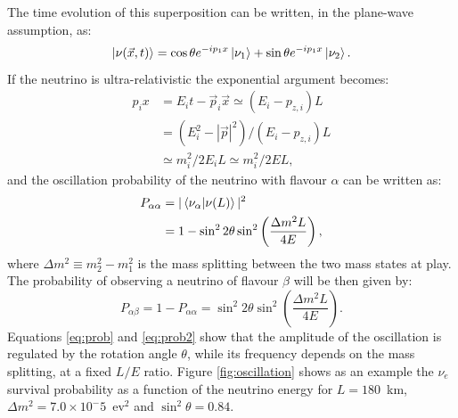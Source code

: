 The time evolution of this superposition can be written, in the plane-wave assumption, as:
\begin{equation}
    \ket{\nu(\vec{x},t)} = \cos\theta e^{-ip_{1}x}\ket{\nu_{1}}+\sin\theta e^{-ip_{1}x}\ket{\nu_{2}}.
\end{equation}
If the neutrino is ultra-relativistic the exponential argument becomes:
\begin{equation}
\begin{split}
    p_{i}x & = E_{i}t - \vec{p}_{i}\vec{x} \simeq (E_{i}-p_{z,i})L\\
           & = (E_{i}^2-|\vec{p}|^{2})/(E_{i}-p_{z,i})L\\
           & \simeq m_i^{2}/2E_{i}L \simeq m_i^{2}/2E L,
\end{split}
\end{equation}
and the oscillation probability of the neutrino with flavour $\alpha$ can be written as:
\begin{equation}
\begin{split}
    P_{\alpha\alpha} & = |\bra{\nu_{\alpha}}\ket{\nu(L)}|^2\\
                     & = 1 - \sin^2 2\theta \sin^2\left(\frac{\Delta m^{2}L}{4E}\right),\label{eq:prob}
\end{split}
\end{equation}
where $\Delta m^{2} \equiv m^2_2-m^2_1$ is the mass splitting between the two mass states at play. The probability of observing a neutrino of flavour $\beta$ will be then given by:
\begin{equation}
    P_{\alpha\beta} = 1 - P_{\alpha\alpha} = \sin^2 2\theta \sin^2\left(\frac{\Delta m^{2}L}{4E}\right).\label{eq:prob2}
\end{equation}
Equations \ref{eq:prob} and \ref{eq:prob2} show that the amplitude of the oscillation is regulated by the rotation angle $\theta$, while its frequency depends on the mass splitting, at a fixed $L/E$ ratio. Figure \ref{fig:oscillation} shows as an example the $\nu_e$ survival probability as a function of the neutrino energy for $L=180$~km, $\Delta m^2 = 7.0 \times 10^-5$~ev$^2$ and $\sin^2\theta = 0.84$. 

